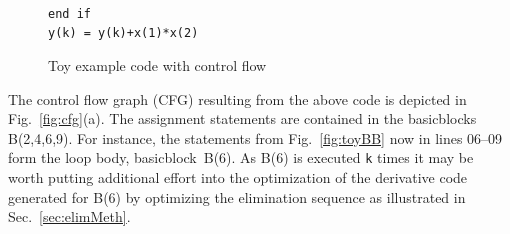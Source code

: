 \documentclass{book}
\newcommand{\basicblock}{basicblock}
\newcommand{\code}[1]{{\small\tt{#1}}}
\newcommand{\refsec}[1]{{Sec.~\ref{#1}}}
\newcommand{\reffig}[1]{{Fig.~\ref{#1}}}
\begin{document}
\begin{figure}
\begin{center}
\begin{minipage}{.5\textwidth}
\begin{tabbing}
        \hspace{.6cm}{\footnotesize \bf 08}\hspace{.5cm} \> \\
        \hspace{.6cm}{\footnotesize \bf 09}\hspace{.5cm} \> \\
        \hspace{.6cm}{\footnotesize \bf 10}\hspace{.5cm}  \\
        \hspace{.6cm}{\footnotesize \bf 11}\hspace{.5cm} {\tt end if } \\
        \hspace{.6cm}{\footnotesize \bf 12}\hspace{.5cm} {\tt y(k) = y(k)+x(1)*x(2) } 
      \end{tabbing}
    \end{minipage}
  \end{center}
  \caption{Toy example code with control flow}\label{fig:toy}
\end{figure}
The control flow graph (CFG) \cite{ASU86} resulting from the above code is depicted in 
\reffig{fig:cfg}(a).
The assignment statements are contained in the {\basicblock}s B(2,4,6,9).
For instance, 
the statements from \reffig{fig:toyBB} now  in lines 06--09 form the loop body, \basicblock\ B(6).
As B(6) is executed
\code{k} times it may be worth putting
additional effort into the optimization of the derivative code 
generated for B(6) by optimizing the elimination sequence as illustrated in 
\refsec{sec:elimMeth}.
\end{document}
